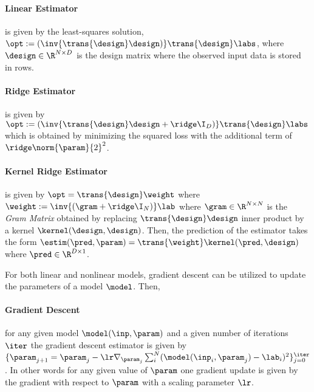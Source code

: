 \paragraph{Linear Estimator} is given by the least-squares solution, $\opt:=(\inv{\trans{\design}\design)}\trans{\design}\labs$, where $\design\in\R^{N\times D}$ is the design matrix where the observed input data is stored in rows.

\paragraph{Ridge Estimator} is given by $\opt:=(\inv{\trans{\design}\design+\ridge \I_{D})}\trans{\design}\labs$ which is obtained by minimizing the squared loss with the additional term of $\ridge\norm{\param}{2}^2$. %

\paragraph{Kernel Ridge Estimator} is given by $\opt= \trans{\design}\weight$ where $\weight:=\inv{(\gram+\ridge\I_{N})}\lab$ where $\gram\in\R^{N\times N}$ is the  \textit{Gram Matrix} obtained by replacing $\trans{\design}\design$ inner product by a kernel $\kernel(\design, \design)$. Then, the prediction of the estimator takes the form $\estim(\pred,\param)=\trans{\weight}\kernel(\pred,\design)$ where $\pred\in\R^{D\times 1}$.

For both linear and nonlinear models, gradient descent can be utilized to update the parameters of a model $\model$. Then,

\paragraph{Gradient Descent} for any given model $\model(\inp, \param)$ and a given number of iterations $\iter$ the gradient descent estimator is given by $\{\param_{j+1}=\param_{j} - \lr\nabla_{\param_j}\sum_i^{N}(\model(\inp_i,\param_j)-\lab_i)^2\}_{j=0}^{\iter}$. In other words for any given value of $\param$ one gradient update is given by the gradient with respect to $\param$ with a scaling parameter $\lr$. 

